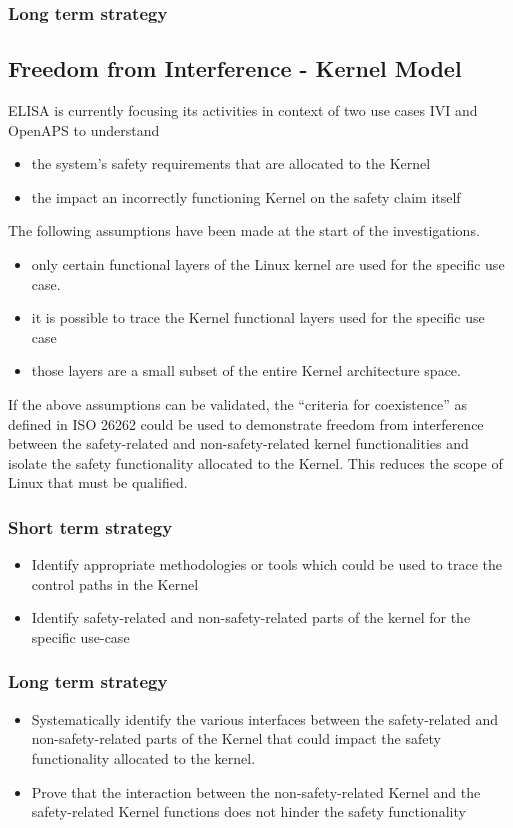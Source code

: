 \documentclass[12pt]{ElisaPaper}
\begin{document}
\subsubsection{Long term strategy}  

\subsection{Freedom from Interference - Kernel Model}
ELISA is currently focusing its activities in context of two use cases IVI and OpenAPS to understand
\begin{itemize} 
	\item the system's safety requirements that are allocated to the Kernel
	\item the impact an incorrectly functioning Kernel on the safety claim itself 
\end{itemize}
The following assumptions have been made at the start of the investigations.
\begin{itemize}
	\item 	only certain functional layers of the Linux kernel are used for the specific use case. 
	\item 	it is possible to trace the Kernel functional layers used for the specific use case
	\item   those layers are a small subset of the entire Kernel architecture space.
\end{itemize} 

If the above assumptions can be validated, the “criteria for coexistence”
as defined in ISO 26262 
could be used to demonstrate freedom from interference between the safety-related and non-safety-related kernel functionalities
and isolate the safety functionality allocated to the Kernel. 
This reduces the scope of Linux that must be qualified.

\subsubsection{Short term strategy}
\begin{itemize}
	\item	Identify appropriate methodologies or tools which could be used to trace the control paths in the Kernel 
	\item	Identify safety-related and non-safety-related parts of the kernel for the specific use-case
\end{itemize}
\subsubsection{Long term strategy}
\begin{itemize}
\item	Systematically identify the various interfaces between the safety-related and non-safety-related parts of the Kernel that could impact the safety functionality allocated to the kernel.
\item	Prove that the interaction between the non-safety-related Kernel and the safety-related Kernel functions does not hinder the safety functionality
\end{itemize}
\end{document}
